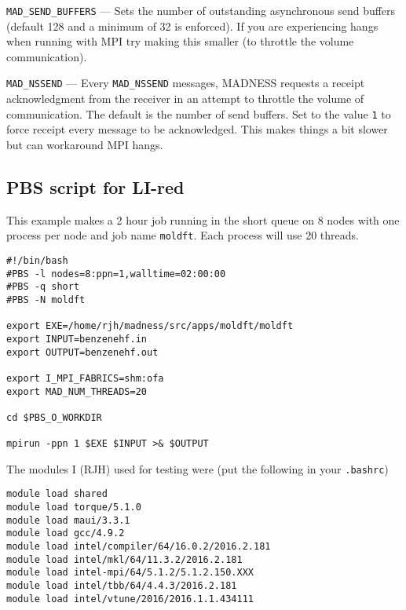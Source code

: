 \documentclass[letterpaper]{book}
\begin{document}
\verb+MAD_SEND_BUFFERS+ --- Sets the number of outstanding
asynchronous send buffers (default 128 and a minimum of 32 is
enforced).  If you are experiencing hangs when running with MPI try
making this smaller (to throttle the volume communication).

\verb+MAD_NSSEND+ --- Every \verb+MAD_NSSEND+ messages, MADNESS
requests a receipt acknowledgment from the receiver in an attempt to
throttle the volume of communication.  The default is the number of
send buffers.  Set to the value \verb+1+ to force receipt every
message to be acknowledged.  This makes things a bit slower but can
workaround MPI hangs.

\subsection{PBS script for LI-red}
\label{sec:pbslired}

This example makes a 2 hour job running in the short queue on 8 nodes
with one process per node and job name {\tt moldft}.  Each process
will use 20 threads.

\begin{verbatim}
#!/bin/bash                                                                     
#PBS -l nodes=8:ppn=1,walltime=02:00:00                                         
#PBS -q short                                                                   
#PBS -N moldft                                                                  

export EXE=/home/rjh/madness/src/apps/moldft/moldft
export INPUT=benzenehf.in
export OUTPUT=benzenehf.out

export I_MPI_FABRICS=shm:ofa
export MAD_NUM_THREADS=20

cd $PBS_O_WORKDIR

mpirun -ppn 1 $EXE $INPUT >& $OUTPUT
\end{verbatim}

The modules I (RJH) used for testing were (put the following in your \verb+.bashrc+)
\begin{verbatim}
module load shared                                                              
module load torque/5.1.0                                                        
module load maui/3.3.1                                                          
module load gcc/4.9.2                                                           
module load intel/compiler/64/16.0.2/2016.2.181                                 
module load intel/mkl/64/11.3.2/2016.2.181
module load intel-mpi/64/5.1.2/5.1.2.150.XXX
module load intel/tbb/64/4.4.3/2016.2.181
module load intel/vtune/2016/2016.1.1.434111
\end{verbatim}
\end{document}
